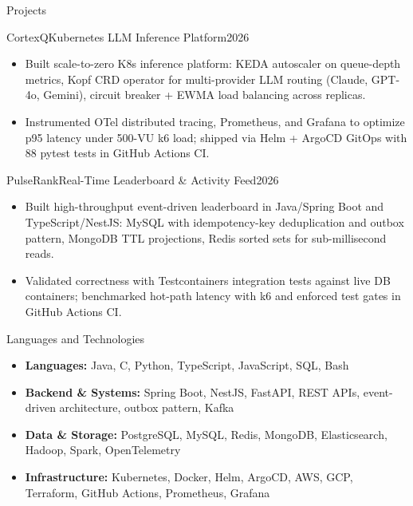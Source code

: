 \documentclass[]{mcdowellcv}
\begin{document}
\begin{cvsection}{Projects}
  \begin{cvsubsection}{CortexQ}{Kubernetes LLM Inference Platform}{2026}
    \begin{itemize}
      \item Built scale-to-zero K8s inference platform: KEDA autoscaler on queue-depth metrics, Kopf CRD operator for multi-provider LLM routing (Claude, GPT-4o, Gemini), circuit breaker + EWMA load balancing across replicas.
      \item Instrumented OTel distributed tracing, Prometheus, and Grafana to optimize p95 latency under 500-VU k6 load; shipped via Helm + ArgoCD GitOps with 88 pytest tests in GitHub Actions CI.
    \end{itemize}
    \vspace{-1.5pt}
  \end{cvsubsection}

  \begin{cvsubsection}{PulseRank}{Real-Time Leaderboard \& Activity Feed}{2026}
    \begin{itemize}
      \item Built high-throughput event-driven leaderboard in Java/Spring Boot and TypeScript/NestJS: MySQL with idempotency-key deduplication and outbox pattern, MongoDB TTL projections, Redis sorted sets for sub-millisecond reads.
      \item Validated correctness with Testcontainers integration tests against live DB containers; benchmarked hot-path latency with k6 and enforced test gates in GitHub Actions CI.
    \end{itemize}
    \vspace{-1.5pt}
  \end{cvsubsection}

\end{cvsection}

\begin{cvsection}{Languages and Technologies}
  \begin{cvsubsection}{}{}{}
    \begin{itemize}
      \item \textbf{Languages:} Java, C, Python, TypeScript, JavaScript, SQL, Bash
      \item \textbf{Backend \& Systems:} Spring Boot, NestJS, FastAPI, REST APIs, event-driven architecture, outbox pattern, Kafka
      \item \textbf{Data \& Storage:} PostgreSQL, MySQL, Redis, MongoDB, Elasticsearch, Hadoop, Spark, OpenTelemetry
      \item \textbf{Infrastructure:} Kubernetes, Docker, Helm, ArgoCD, AWS, GCP, Terraform, GitHub Actions, Prometheus, Grafana
    \end{itemize}
  \end{cvsubsection}
\end{cvsection}
\end{document}
